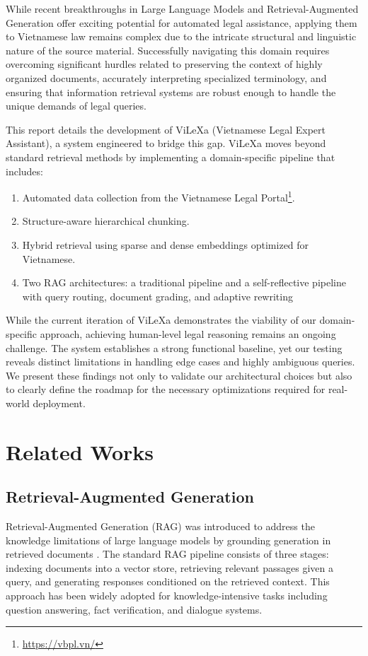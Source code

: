 \documentclass[letterpaper]{article} %
\begin{document}
While recent breakthroughs in Large Language Models and Retrieval-Augmented Generation offer exciting potential for automated legal assistance, applying them to Vietnamese law remains complex due to the intricate structural and linguistic nature of the source material. Successfully navigating this domain requires overcoming significant hurdles related to preserving the context of highly organized documents, accurately interpreting specialized terminology, and ensuring that information retrieval systems are robust enough to handle the unique demands of legal queries.

This report details the development of ViLeXa (Vietnamese Legal Expert Assistant), a system engineered to bridge this gap. ViLeXa moves beyond standard retrieval methods by implementing a domain-specific pipeline that includes:

\begin{enumerate}
	\item Automated data collection from the Vietnamese Legal Portal\footnote{\url{https://vbpl.vn/}}.
	\item Structure-aware hierarchical chunking.
	\item Hybrid retrieval using sparse and dense embeddings optimized for Vietnamese.
	\item Two RAG architectures: a traditional pipeline and a self-reflective pipeline with query routing, document grading, and adaptive rewriting
\end{enumerate}

While the current iteration of ViLeXa demonstrates the viability of our domain-specific approach, achieving human-level legal reasoning remains an ongoing challenge. The system establishes a strong functional baseline, yet our testing reveals distinct limitations in handling edge cases and highly ambiguous queries. We present these findings not only to validate our architectural choices but also to clearly define the roadmap for the necessary optimizations required for real-world deployment.

\section{Related Works}

\subsection{Retrieval-Augmented Generation}

Retrieval-Augmented Generation (RAG) was introduced to address the knowledge limitations of large language models by grounding generation in retrieved documents \cite{lewis2020retrieval}. The standard RAG pipeline consists of three stages: indexing documents into a vector store, retrieving relevant passages given a query, and generating responses conditioned on the retrieved context. This approach has been widely adopted for knowledge-intensive tasks including question answering, fact verification, and dialogue systems.
\end{document}
